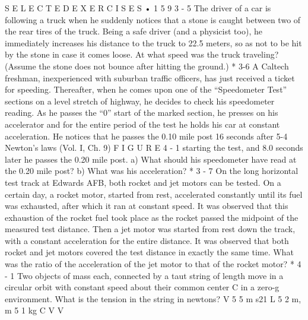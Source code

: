 \documentclass[10pt,oneside]{article}
\begin{document}
S E L E C T E D  E X E R C I S E S • 1 5 9 \emph{ } 3 - 5 The driver of a car is following a truck when he suddenly notices that a stone is caught between two of the rear tires of the truck. Being a safe driver (and a physicist too), he immediately increases his distance to the truck to 22.5 meters, so as not to be hit by the stone in case it comes loose. At what speed was the truck traveling? (Assume the stone does not bounce after hitting the ground.) \emph{ } * 3-6 A Caltech freshman, inexperienced with suburban traffic officers, has just received a ticket for speeding. Thereafter, when he comes upon one of the “Speedometer Test” sections on a level stretch of highway, he decides to check his speedometer reading. As he passes the “0” start of the marked section, he presses on his accelerator and for the entire period of the test he holds his car at constant acceleration. He notices that he passes the 0.10 mile post 16 seconds after 5-4 Newton’s laws (Vol. I, Ch. 9) F I G U R E  4 - 1 starting the test, and 8.0 seconds later he passes the 0.20 mile post. a) What should his speedometer have read at the 0.20 mile post? b) What was his acceleration? \emph{ } * 3 - 7 On the long horizontal test track at Edwards AFB, both rocket and jet motors can be tested. On a certain day, a rocket motor, started from rest, accelerated constantly until its fuel was exhausted, after which it ran at constant speed. It was observed that this exhaustion of the rocket fuel took place as the rocket passed the midpoint of the measured test distance. Then a jet motor was started from rest down the track, with a constant acceleration for the entire distance. It was observed that both rocket and jet motors covered the test distance in exactly the same time. What was the ratio of the acceleration of the jet motor to that of the rocket motor? * 4 - 1 Two objects of mass each, connected by a taut string of length move in a circular orbit with constant speed about their common center C in a zero-g environment. What is the tension in the string in newtons? V 5 5 m s21 L 5 2 m, m 5 1 kg C V V\par
\end{document}
